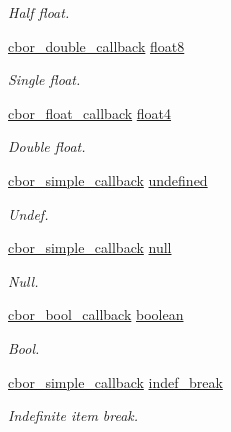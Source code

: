 \begin{DoxyCompactItemize}
\begin{DoxyCompactList}\small\item\em Half float. \end{DoxyCompactList}\item 
\hyperlink{callbacks_8h_af46757188a6212506a8fc73a1d098ae7}{cbor\-\_\-double\-\_\-callback} \hyperlink{structcbor__callbacks_a5a80bae7d106e7cf61d27cd710251e4a}{float8}
\begin{DoxyCompactList}\small\item\em Single float. \end{DoxyCompactList}\item 
\hyperlink{callbacks_8h_a70c40374bfa3cc289a975e8d3d31eb74}{cbor\-\_\-float\-\_\-callback} \hyperlink{structcbor__callbacks_a3e0e5094fdfbc527f9a2ca300d65b7df}{float4}
\begin{DoxyCompactList}\small\item\em Double float. \end{DoxyCompactList}\item 
\hyperlink{callbacks_8h_a414becb6eeb6a2c4fcb4d657b17d3113}{cbor\-\_\-simple\-\_\-callback} \hyperlink{structcbor__callbacks_af9b30de5bef7bf76e8e34bdd95434f98}{undefined}
\begin{DoxyCompactList}\small\item\em Undef. \end{DoxyCompactList}\item 
\hyperlink{callbacks_8h_a414becb6eeb6a2c4fcb4d657b17d3113}{cbor\-\_\-simple\-\_\-callback} \hyperlink{structcbor__callbacks_a7483f952b13db66abd893082a204859d}{null}
\begin{DoxyCompactList}\small\item\em Null. \end{DoxyCompactList}\item 
\hyperlink{callbacks_8h_a86190658d37fb499ff8e30f0a85a19bc}{cbor\-\_\-bool\-\_\-callback} \hyperlink{structcbor__callbacks_a458321ece8c64be2c37b96f78bbdfb8c}{boolean}
\begin{DoxyCompactList}\small\item\em Bool. \end{DoxyCompactList}\item 
\hyperlink{callbacks_8h_a414becb6eeb6a2c4fcb4d657b17d3113}{cbor\-\_\-simple\-\_\-callback} \hyperlink{structcbor__callbacks_abc0516d80611473d2527bf5faea393d8}{indef\-\_\-break}
\begin{DoxyCompactList}\small\item\em Indefinite item break. \end{DoxyCompactList}\end{DoxyCompactItemize}


